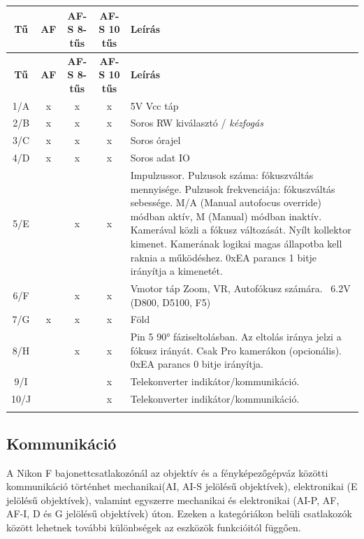 \begin{tabularx}{\textwidth}{|c|c|c|c|X|}
    \hline
    \rowcolor{lightgray}\textbf{Tű} & \textbf{AF} & \textbf{AF-S 8-tűs} & \textbf{AF-S 10 tűs} & \textbf{Leírás} \\
    \hline
    \endfirsthead
    
    \hline
    \rowcolor{lightgray}\textbf{Tű} & \textbf{AF} & \textbf{AF-S 8-tűs} & \textbf{AF-S 10 tűs} & \textbf{Leírás} \\
    \hline
    \endhead
    
    1/A & x & x & x & 5V Vcc táp \\
    \hline
    2/B & x & x & x & Soros RW kiválasztó / \textit{kézfogás} \\
    \hline
    3/C & x & x & x & Soros órajel \\
    \hline
    4/D & x & x & x & Soros adat IO \\
    \hline
    5/E &   & x & x & Impulzussor. Pulzusok száma: fókuszváltás mennyisége. Pulzusok frekvenciája: fókuszváltás sebessége. M/A (Manual autofocus override) módban aktív, M (Manual) módban inaktív. Kamerával közli a fókusz változását. Nyílt kollektor kimenet. Kamerának logikai magas állapotba kell raknia a működéshez. 0xEA parancs 1 bitje irányítja a kimenetét. \\
    \hline
    6/F &   & x & x & Vmotor táp Zoom, VR, Autofókusz számára. ~6.2V (D800, D5100, F5) \\
    \hline
    7/G & x & x & x & Föld \\
    \hline
    8/H &   & x & x & Pin 5 90° fáziseltolásban. Az eltolás iránya jelzi a fókusz irányát. Csak Pro kamerákon (opcionális). 0xEA parancs 0 bitje irányítja. \\
    \hline
    9/I &   &   & x & Telekonverter indikátor/kommunikáció. \\
    \hline
    10/J &   &   & x & Telekonverter indikátor/kommunikáció. \\
    \hline
    \caption{Nikon F csatlakozás kontaktok szerepei.}
    \label{tab:nikon_pins}
\end{tabularx}

\subsection{Kommunikáció}
A Nikon F bajonettcsatlakozónál az objektív és a fényképezőgépváz közötti kommunikáció történhet mechanikai(AI, AI-S jelölésű objektívek)\cite{Lens_naming}, elektronikai (E jelölésű objektívek)\cite{Lens_naming}, valamint egyszerre mechanikai és elektronikai (AI-P, AF, AF-I, D és G jelölésű objektívek)%
\cite{Nikon_CPU}úton. Ezeken a kategóriákon belüli csatlakozók között lehetnek további különbségek az eszközök funkcióitól függően.

